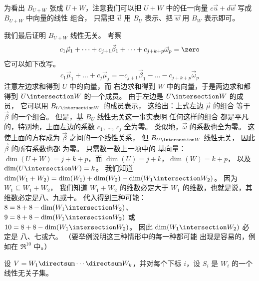 \begin{exercises}
\begin{answer}
\begin{exparts}
        为看出 $B_{U+W}$ 张成 $U+W$，注意我们可以把
        $U+W$ 中的任一向量 $c\vec{u}+d\vec{w}$ 写成
        $B_{U+W}$ 中向量的线性
        组合，
        只需把 $\vec{u}$ 用
        $B_U$ 表示、把 $\vec{w}$ 用 $B_W$ 表示即可。

         我们最后证明 $B_{U+W}$ 线性无关。 
         考察
         \begin{equation*}
           c_1\vec{\mu}_1+\dots+c_{j+1}\vec{\beta}_1+\dots
              +c_{j+k+p}\vec{\omega}_p=\zero
         \end{equation*}
         它可以如下改写。
         \begin{equation*}
           c_1\vec{\mu}_1+\dots+c_j\vec{\mu}_j=
             -c_{j+1}\vec{\beta}_1-\dots-c_{j+k+p}\vec{\omega}_p
         \end{equation*}
         注意左边求和得到 \( U \) 中的向量，而
         右边求和得到 \( W \) 中的向量，于是两边求和都得到
         $U\intersection W$ 的一个成员。
         由于左边是 $U\intersection W$ 的成员，
         它可以用 $B_{U\intersection W}$ 的成员表示，
         这给出：上式左边 $\vec{\mu}$ 的组合
         等于 $\vec{\beta}$ 的一个组合。 
         但是，基 $B_U$ 线性无关这一事实表明
         任何这样的组合
         都是平凡的，特别地，上面左边的系数 $c_1$, \ldots,
         $c_j$ 全为零。
         类似地，\( \vec{\omega} \) 的系数也全为零。
         这使上面的方程成为
         \( \vec{\beta} \) 之间的一个线性关系，
         但 $B_{U\intersection W}$ 线性无关，
         因此 $\vec{\beta}$ 的所有系数也都
         为零。
        \partsitem 只需数一数上一项中的
          基向量：~$\dim(U+W)=j+k+p$，而 $\dim(U)=j+k$，$\dim(W)=k+p$，
          以及 $\dim(U\intersection W)=k$。
        \partsitem  我们知道
          \( \dim(W_1+W_2)=\dim(W_1)+\dim(W_2)-\dim(W_1\intersection W_2) \)。
          因为 \( W_1\subseteq W_1+W_2 \)，
          我们知道 \( W_1+W_2 \) 的维数必定大于
          $W_1$ 的维数，也就是说，其维数必定是八、九或十。
          代入得到三种可能：
          $8=8+8-\dim(W_1\intersection W_2)$、
          $9=8+8-\dim(W_1\intersection W_2)$ 或
          $10=8+8-\dim(W_1\intersection W_2)$。
          因此 \( \dim(W_1\intersection W_2) \) 必定是
          八、七或六。
          （要举例说明这三种情形中的每一种都可能
          出现是容易的，例如在 \( \Re^{10} \) 中。）  
      \end{exparts}
    \end{answer}
  \item 
    设 \( V=W_1\directsum\cdots\directsum W_k \)，并对每个下标
    \( i \)，设 \( S_i \) 是
    \( W_i \) 的一个线性无关子集。

\end{exercises}
